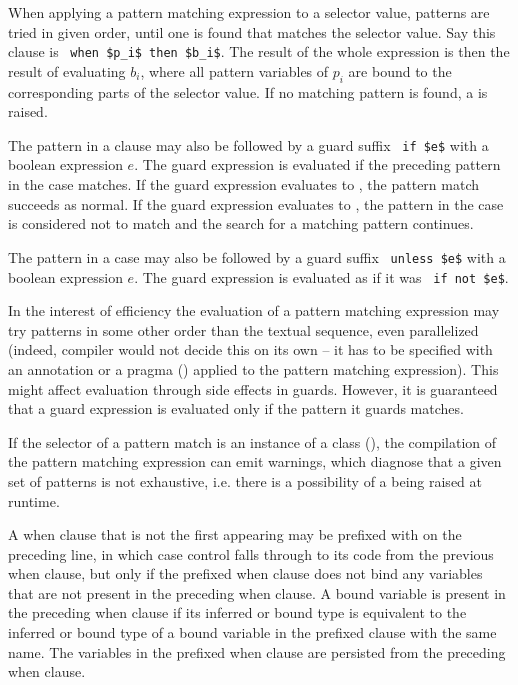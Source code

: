 When applying a pattern matching expression to a selector value, patterns are tried in given order, until one is found that matches the selector value. Say this  clause is ~\lstinline!when $p_i$ then $b_i$!. The result of the whole expression is then the result of evaluating $b_i$, where all pattern variables of $p_i$ are bound to the corresponding parts of the selector value. If no matching pattern is found, a  is raised. 

The pattern in a  clause may also be followed by a guard suffix ~\lstinline!if $e$! with a boolean expression $e$. The guard expression is evaluated if the preceding pattern in the case matches. If the guard expression evaluates to , the pattern match succeeds as normal. If the guard expression evaluates to , the pattern in the case is considered not to match and the search for a matching pattern continues. 

The pattern in a case may also be followed by a guard suffix ~\lstinline!unless $e$! with a boolean expression $e$. The guard expression is evaluated as if it was ~\lstinline!if not $e$!. 

In the interest of efficiency the evaluation of a pattern matching expression may try patterns in some other order than the textual sequence, even parallelized (indeed, compiler would not decide this on its own -- it has to be specified with an annotation or a pragma () applied to the pattern matching expression). This might affect evaluation through side effects in guards. However, it is guaranteed that a guard expression is evaluated only if the pattern it guards matches.

If the selector of a pattern match is an instance of a  class (), the compilation of the pattern matching expression can emit warnings, which diagnose that a given set of patterns is not exhaustive, i.e. there is a possibility of a  being raised at runtime. 

A when clause that is not the first appearing may be prefixed with  on the preceding line, in which case control falls through to its code from the previous when clause, but only if the prefixed when clause does not bind any variables that are not present in the preceding when clause. A bound variable is present in the preceding when clause if its inferred or bound type is equivalent to the inferred or bound type of a bound variable in the prefixed clause with the same name. The variables in the prefixed when clause are persisted from the preceding when clause. 






